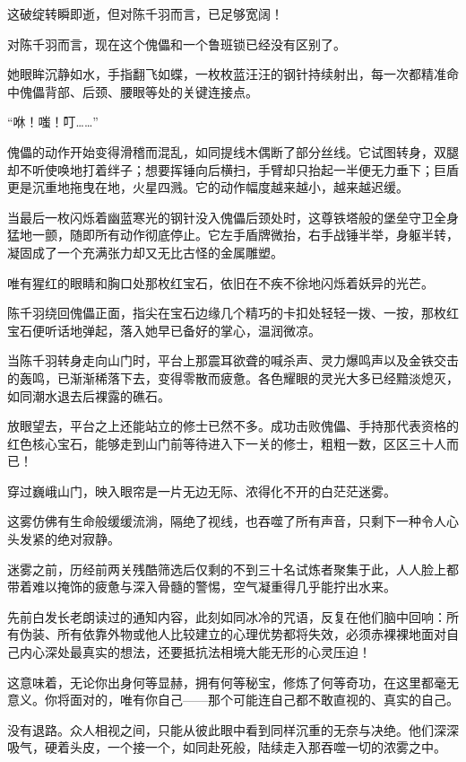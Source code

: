 这破绽转瞬即逝，但对陈千羽而言，已足够宽阔！

对陈千羽而言，现在这个傀儡和一个鲁班锁已经没有区别了。

她眼眸沉静如水，手指翻飞如蝶，一枚枚蓝汪汪的钢针持续射出，每一次都精准命中傀儡背部、后颈、腰眼等处的关键连接点。

“咻！嗤！叮……”

傀儡的动作开始变得滑稽而混乱，如同提线木偶断了部分丝线。它试图转身，双腿却不听使唤地打着绊子；想要挥锤向后横扫，手臂却只抬起一半便无力垂下；巨盾更是沉重地拖曳在地，火星四溅。它的动作幅度越来越小，越来越迟缓。

当最后一枚闪烁着幽蓝寒光的钢针没入傀儡后颈处时，这尊铁塔般的堡垒守卫全身猛地一颤，随即所有动作彻底停止。它左手盾牌微抬，右手战锤半举，身躯半转，凝固成了一个充满张力却又无比古怪的金属雕塑。

唯有猩红的眼睛和胸口处那枚红宝石，依旧在不疾不徐地闪烁着妖异的光芒。

陈千羽绕回傀儡正面，指尖在宝石边缘几个精巧的卡扣处轻轻一拨、一按，那枚红宝石便听话地弹起，落入她早已备好的掌心，温润微凉。

当陈千羽转身走向山门时，平台上那震耳欲聋的喊杀声、灵力爆鸣声以及金铁交击的轰鸣，已渐渐稀落下去，变得零散而疲惫。各色耀眼的灵光大多已经黯淡熄灭，如同潮水退去后裸露的礁石。

放眼望去，平台之上还能站立的修士已然不多。成功击败傀儡、手持那代表资格的红色核心宝石，能够走到山门前等待进入下一关的修士，粗粗一数，区区三十人而已！

\vspace{2em}

穿过巍峨山门，映入眼帘是一片无边无际、浓得化不开的白茫茫迷雾。

这雾仿佛有生命般缓缓流淌，隔绝了视线，也吞噬了所有声音，只剩下一种令人心头发紧的绝对寂静。

迷雾之前，历经前两关残酷筛选后仅剩的不到三十名试炼者聚集于此，人人脸上都带着难以掩饰的疲惫与深入骨髓的警惕，空气凝重得几乎能拧出水来。

先前白发长老朗读过的通知内容，此刻如同冰冷的咒语，反复在他们脑中回响：所有伪装、所有依靠外物或他人比较建立的心理优势都将失效，必须赤裸裸地面对自己内心深处最真实的想法，还要抵抗法相境大能无形的心灵压迫！

这意味着，无论你出身何等显赫，拥有何等秘宝，修炼了何等奇功，在这里都毫无意义。你将面对的，唯有你自己——那个可能连自己都不敢直视的、真实的自己。

没有退路。众人相视之间，只能从彼此眼中看到同样沉重的无奈与决绝。他们深深吸气，硬着头皮，一个接一个，如同赴死般，陆续走入那吞噬一切的浓雾之中。

